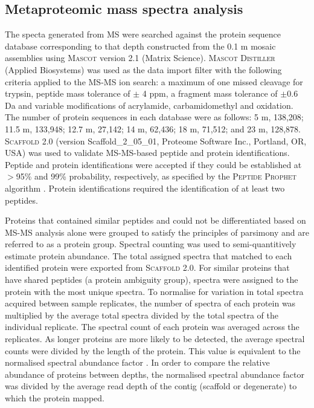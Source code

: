 \subsection{Metaproteomic mass spectra analysis}
The specta generated from \ac{MS} were searched against the protein sequence database corresponding to that depth constructed from the 0.1 \textmu{}m mosaic assemblies using \textsc{Mascot} version 2.1 (Matrix Science).
\textsc{Mascot Distiller} (Applied Biosystems) was used as the data import filter with the following criteria applied to the \ac{MS-MS} ion search: a maximum of one missed cleavage for trypsin, peptide mass tolerance of $\pm$ 4 ppm, a fragment mass tolerance of $\pm$0.6 Da and variable modifications of acrylamide, carbamidomethyl and oxidation.
The number of protein sequences in each database were as follows: 5 m, 138,208; 11.5 m, 133,948; 12.7 m, 27,142; 14 m, 62,436; 18 m, 71,512; and 23 m, 128,878. 
\textsc{Scaffold} 2.0 (version Scaffold\_2\_05\_01, Proteome Software Inc., Portland, \textsc{OR}, \textsc{USA}) was used to validate \ac{MS-MS}-based peptide and protein identifications. 
Peptide and protein identifications were accepted if they could be established at $>$95\% and 99\% probability, respectively, as specified by the \textsc{Peptide Prophet} algorithm \cite{Keller2002}. 
Protein identifications required the identification of at least two peptides.
 
Proteins that contained similar peptides and could not be differentiated based on \ac{MS-MS} analysis alone were grouped to satisfy the principles of parsimony and are referred to as a protein group. 
Spectral counting was used to semi-quantitively estimate protein abundance. 
The total assigned spectra that matched to each identified protein were exported from \textsc{Scaffold} 2.0. 
For similar proteins that have shared peptides (a protein ambiguity group), spectra were assigned to the protein with the most unique spectra. 
To normalise for variation in total spectra acquired between sample replicates, the number of spectra of each protein was multiplied by the average total spectra divided by the total spectra of the individual replicate. 
The spectral count of each protein was averaged across the replicates. 
As longer proteins are more likely to be detected, the average spectral counts were divided by the length of the protein. 
This value is equivalent to the normalised spectral abundance factor \cite{Florens2006, Zybailov2006}. 
In order to compare the relative abundance of proteins between depths, the normalised spectral abundance factor was divided by the average read depth of the contig (scaffold or degenerate) to which the protein mapped. 

